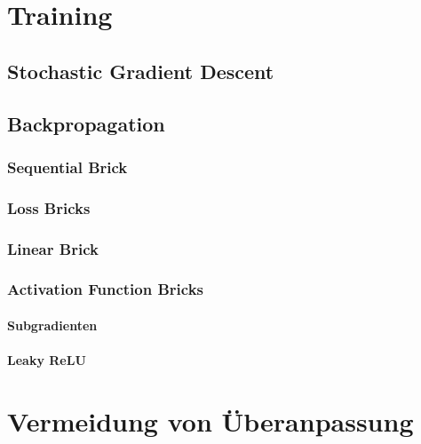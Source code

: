 	\section{Training} %

		\subsection{Stochastic Gradient Descent} %

		\subsection{Backpropagation} %

			\subsubsection{Sequential Brick} %

			\subsubsection{Loss Bricks} %

			\subsubsection{Linear Brick} %

			\subsubsection{Activation Function Bricks} %

				\paragraph{Subgradienten} %

				\paragraph{Leaky ReLU} %

	\section{Vermeidung von Überanpassung} %

